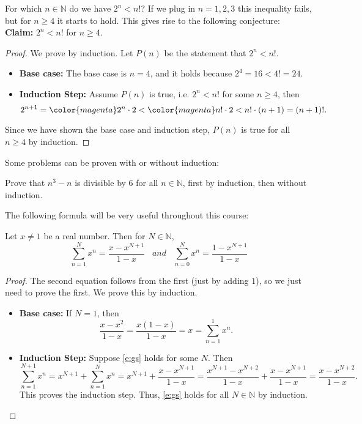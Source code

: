 \documentclass[11pt,dvipsnames]{book}
\numberwithin{figure}{section} %
\numberwithin{table}{section} %
\begin{document}
\begin{example}
For which $n\in\mathbb{N}$ do we have $2^{n}<n!$? If we plug in $n=1,2,3$ this inequality fails, but for $n\geq 4$ it starts to hold. This gives rise to the following conjecture:\\

{\bf Claim:} $2^{n}<n!$ for $n\geq 4$.

\begin{proof}
We prove by induction.  Let $P(n)$ be the statement that $2^{n}<n!$.

\begin{itemize}
\item {\bf Base case:} The base case is $n=4$, and it holds because $2^{4} = 16 < 4!=24$. \\

\item {\bf Induction Step:} Assume $P(n)$ is true, i.e. {\color{magenta} $2^{n}<n!$} for some $n\geq 4$, then
\[
2^{n+1} = {\color{magenta} 2^{n}}\cdot 2 < {\color{magenta}n!}\cdot 2 < n! \cdot (n+1)=(n+1)!.
\]
\end{itemize}
Since we have shown the base case and induction step, $P(n)$ is true for all $n\geq 4$ by induction.
\end{proof}
\end{example}

Some problems can be proven with or without induction:

\begin{exercise}
Prove that $n^{3}-n$ is divisible by $6$ for all $n\in\mathbb{N}$, first by induction, then without induction.
\end{exercise}

The following formula will be very useful throughout this course:

\begin{theorem}
Let $x\neq 1$ be a real number. Then for $N\in\mathbb{N}$,
\begin{equation}
\label{e:gs}
\sum_{n=1}^{N} x^{n}=\frac{x-x^{N+1}}{1-x} \;\;\;and \;\;\;  \sum_{n=0}^{N} x^{n}=\frac{1-x^{N+1}}{1-x}
\end{equation}
\end{theorem}

\begin{proof}
The second equation follows from the first (just by adding $1$), so we just need to prove the first. We prove this by induction.
\begin{itemize}
\item {\bf Base case:} If $N=1$, then
\[
 \frac{x-x^{2}}{1-x} = \frac{x(1-x)}{1-x}=x=\sum_{n=1}^{1} x^{n}.
 \]
 \item {\bf Induction Step:} Suppose \eqref{e:gs} holds for some $N$. Then
 \[
 \sum_{n=1}^{N+1} x^{n}
 =x^{N+1}+ \sum_{n=1}^{N} x^{n}
 =x^{N+1} + \frac{x-x^{N+1}}{1-x}
 =\frac{x^{N+1}-x^{N+2}}{1-x} + \frac{x-x^{N+1}}{1-x}
 =\frac{x-x^{N+2}}{1-x}.
 \]
 This proves the induction step. Thus, \eqref{e:gs} holds for all $N\in\mathbb{N}$ by induction.
 \end{itemize}
\end{proof}
\end{document}

